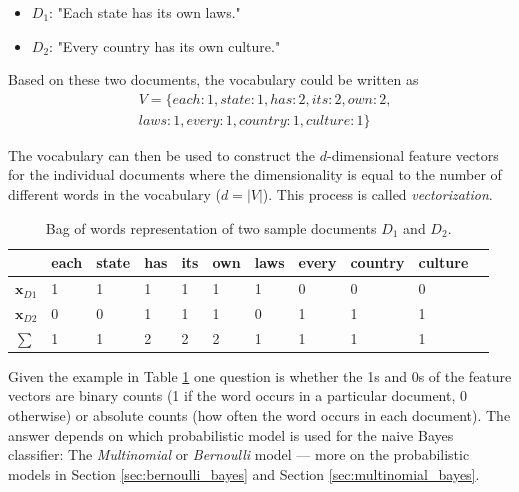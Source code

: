 \documentclass{article}
\begin{document}
\begin{itemize}
	\item $D_1$: "Each state has its own laws."
	\item $D_2$: "Every country has its own culture."
\end{itemize}

Based on these two documents, the vocabulary could be written as \\

\begin{equation} 
\begin{split}
&V= \{each: 1, state: 1, has: 2, its: 2, own: 2, \\
& laws: 1, every: 1, country: 1, culture: 1\} 
\end{split}
\end{equation}

The vocabulary can then be used to construct the $d$-dimensional feature vectors for the individual documents where the dimensionality is equal to the number of different words in the vocabulary ($d=|V|$). This process is called \emph{vectorization}.



\begin{table}[h]

\caption{Bag of words representation of two sample documents $D_1$ and $D_2$.}
\begin{tabular}{l l l l l l l l l l l} \hline
& each   & state & has & its & own & laws & every & country & culture &   \\ \hline
$\textbf{x}_{D1}$             & 1     & 1   & 1   & 1   & 1    & 1     & 0       & 0       & 0  \\ 
$\textbf{x}_{D2}$             & 0     & 0   & 1   & 1   & 1    & 0     & 1       & 1       & 1 \\ 
$\sum$ & 1     & 1   & 2   & 2   & 2    & 1     & 1       & 1       & 1 \\ \hline
\end{tabular}
\label{fig:bag_of_words}
\end{table}


Given the example in Table \ref{fig:bag_of_words} one question is whether the 1s and 0s of the feature vectors are binary counts (1 if the word occurs in a particular document, 0 otherwise) or absolute counts (how often the word occurs in each document). The answer depends  on which probabilistic model is used for the naive Bayes classifier: The \emph{Multinomial} or \emph{Bernoulli} model --- more on the probabilistic models in Section \ref{sec:bernoulli_bayes} and Section \ref{sec:multinomial_bayes}.
\end{document}
